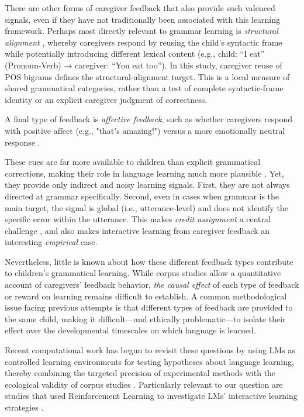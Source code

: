 There are other forms of caregiver feedback that also provide such valenced signals, even if they have not traditionally been associated with this learning framework. Perhaps most directly relevant to grammar learning is \textit{structural alignment} \cite{fusaroli_caregiver_2023, dale_unraveling_2006, fernandez_quantifying_2014, misiek_development_2020}, whereby caregivers respond by reusing the child's syntactic frame while potentially introducing different lexical content (e.g., child: “I eat” (Pronoun-Verb) → caregiver: “You eat too”). In this study, caregiver reuse of POS bigrams defines the structural-alignment target. This is a local measure of shared grammatical categories, rather than a test of complete syntactic-frame identity or an explicit caregiver judgment of correctness.

A final type of feedback is \textit{affective feedback}, such as whether caregivers respond with positive affect (e.g., "that's amazing!") versus a more emotionally neutral response \cite{rivero2023relations}.
 
These cues are far more available to children than explicit grammatical corrections, making their role in language learning much more plausible \cite{demetras_feedback_1986, hirsh-pasek_brown_1984}. Yet, they provide only indirect and noisy learning signals. First, they are not always directed at grammar specifically. Second, even in cases when grammar is the main target, the signal is global (i.e., utterance-level) and does not identify the specific error within the utterance. This makes \textit{credit assignment} a central challenge \cite{marcus_negative_1993, pinker_learnability_1989, saxton_contrast_1997}, and also makes interactive learning from caregiver feedback an interesting \emph{empirical} case.

Nevertheless, little is known about how these different feedback types contribute to children’s grammatical learning. While corpus studies allow a quantitative account of caregivers' feedback behavior, \textit{the causal effect} of each type of feedback or reward on learning remains difficult to establish. A common methodological issue facing previous attempts \cite[e.g., see discussion in][]{saxton_negative_2005} is that different types of feedback are provided to the same child, making it difficult---and ethically problematic---to isolate their effect over the developmental timescales on which language is learned.

Recent computational work has begun to revisit these questions by using LMs as controlled learning environments for testing hypotheses about language learning, thereby combining the targeted precision of experimental methods with the ecological validity of corpus studies \cite[e.g.,][]{misra2024language}. Particularly relevant to our  question are studies that used Reinforcement Learning to investigate LMs' interactive learning strategies \cite{ma_babysit_2024, martins-etal-2025-upon, zhao-etal-2023-babystories, padovani2025dialogue, xu2025wanting, nikolaus_modeling_2021}.

